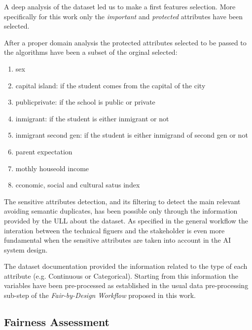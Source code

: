\documentclass[12pt,a4paper,openright,twoside]{book}
\begin{document}
A deep analysis of the dataset led us to make a first features selection. More specifically for this work only the \emph{important} and \emph{protected} attributes have been selected.

After a proper domain analysis the protected attributes selected to be passed to the algorithms have been a subset of the orginal selected:

\begin{enumerate}

    \item sex

    \item capital island: if the student comes from the capital of the city

    \item public\textunderscore private: if the school is public or private

    \item inmigrant: if the student is either inmigrant or not

    \item inmigrant second gen: if the student is either inmigrand of second gen or not

    \item parent expectation
    
    \item mothly houseold income

    \item cconomic, social and cultural satus index

\end{enumerate}

The sensitive attributes detection, and its filtering to detect the main relevant avoiding semantic duplicates, has been possible only through the information provided by the ULL about the dataset. As specified in the general workflow the interation between the technical figuers and the stakeholder is even more fundamental when the sensitive attributes are taken into account in the AI system design.

The dataset documentation provided the information related to the type of each attribute (e.g. Continuous or Categorical). Starting from this information the variables have been pre-processed as established in the usual data pre-processing sub-step of the \emph{Fair-by-Design Workflow} proposed in this work.

\subsection{Fairness Assessment}
\end{document}
